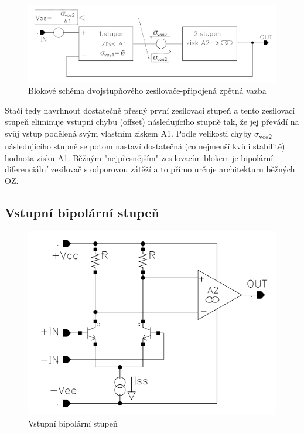 \begin{figure}[h]
   \begin{center}
     \includegraphics[scale=0.5]{images/dvojOZ2.png}
   \end{center}
   \caption{Blokové schéma dvojstupňového zesilovače-připojená zpětná vazba}
\end{figure}

Stačí tedy navrhnout dostatečně přesný první zesilovací stupeň a tento zesilovací stupeň eliminuje vstupní chybu (offset) následujícího stupně tak, že jej převádí na svůj vstup podělená svým vlastním ziskem A1. Podle velikosti chyby $\sigma$\textsubscript{vos2} následujícího stupně se potom nastaví dostatečná (co nejmenší kvůli stabilitě) hodnota zisku A1. Běžným "nejpřesnějším" zesilovacím blokem je bipolární diferenciální zesilovač s odporovou zátěží a to přímo určuje architekturu běžných OZ.

\subsection{Vstupní bipolární stupeň}

\begin{figure}[h]
   \begin{center}
     \includegraphics[scale=0.5]{images/prvnistupen.png}
   \end{center}
   \caption{Vstupní bipolární stupeň}
\end{figure}

